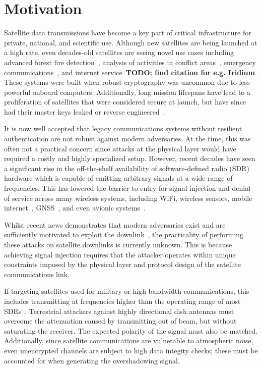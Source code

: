 \section{Motivation}

Satellite data transmissions have become a key part of critical infrastructure for private, national, and scientific use.
Although new satellites are being launched at a high rate, even decades-old satellites are seeing novel use cases including advanced forest fire detection~\cite{nasaFirms}, analysis of activities in conflict areas~\cite{separatistLuminosity}, emergency communications~\cite{apple_emergency_sos}, and internet service~\textbf{TODO: find citation for e.g. Iridium}.
These systems were built when robust cryptography was uncommon due to less powerful onboard computers.
Additionally, long mission lifespans have lead to a proliferation of satellites that were considered secure at launch, but have since had their master keys leaked or reverse engineered~\cite{lrit-key-dec,xrit-rx}.

It is now well accepted that legacy communications systems without resilient authentication are not robust against modern adversaries.
At the time, this was often not a practical concern since attacks at the physical layer would have required a costly and highly specialized setup.
However, recent decades have seen a significant rise in the off-the-shelf availability of software-defined radio (SDR) hardware which is capable of emitting arbitrary signals at a wide range of frequencies.
This has lowered the barrier to entry for signal injection and denial of service across many wireless systems, including WiFi, wireless sensors, mobile internet~\cite{yang2019hiding,erni2021adaptover}, GNSS~\cite{tippenhauer2011requirements}, and even avionic systems~\cite{sathayeWireless2019}.

Whilst recent news demonstrates that modern adversaries exist and are sufficiently motivated to exploit the downlink~\cite{satcomAnalysis}, the practicality of performing these attacks on satellite downlinks is currently unknown.
This is because achieving signal injection requires that the attacker operates within unique constraints imposed by the physical layer and protocol design of the satellite communications link.

If targeting satellites used for military or high bandwidth communications, this includes transmitting at frequencies higher than the operating range of most SDRs~\cite{esa_satellite_bands}.
Terrestrial attackers against highly directional dish antennas must overcome the attenuation caused by transmitting out of beam, but without saturating the receiver.
The expected polarity of the signal must also be matched.
Additionally, since satellite communications are vulnerable to atmospheric noise, even unencrypted channels are subject to high data integity checks; these must be accounted for when generating the overshadowing signal.

